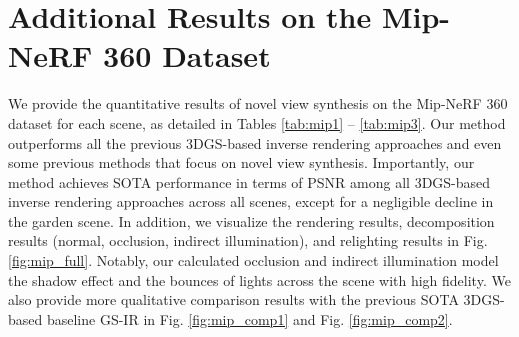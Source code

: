 \documentclass{article} %
\begin{document}
\section{Additional Results on the Mip-NeRF 360 Dataset} \label{appendix_mip}

We provide the quantitative results of novel view synthesis on the Mip-NeRF 360 dataset for each scene, as detailed in Tables \ref{tab:mip1} -- \ref{tab:mip3}. Our method outperforms all the previous 3DGS-based inverse rendering approaches and even some previous methods that focus on novel view synthesis. Importantly, our method achieves SOTA performance in terms of PSNR among all 3DGS-based inverse rendering approaches across all scenes, except for a negligible decline in the garden scene. In addition, we visualize the rendering results, decomposition results (normal, occlusion, indirect illumination), and relighting results in Fig. \ref{fig:mip_full}. Notably, our calculated occlusion and indirect illumination model the shadow effect and the bounces of lights across the scene with high fidelity. We also provide more qualitative comparison results with the previous SOTA 3DGS-based baseline GS-IR in Fig. \ref{fig:mip_comp1} and Fig. \ref{fig:mip_comp2}.
\end{document}
